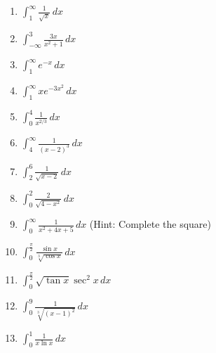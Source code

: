 \documentclass[12pt]{article}
\newif\ifans
\begin{document}
\begin{enumerate}

\item $\int_{1}^{\infty}\frac{1}{\sqrt{x}}\,dx$ 

\ifans{\fbox{$\infty$}} \fi

\item $\int_{-\infty}^{3}\frac{3x}{x^2+1}\,dx$ 

\ifans{\fbox{$-\infty$}} \fi

\item $\int_{1}^{\infty}e^{-x}\,dx$ 

\ifans{\fbox{$\frac{1}{e}$}} \fi

\item $\int_{1}^{\infty}xe^{-3x^2}\,dx$ 

\ifans{\fbox{$\frac{1}{6}e^{-3}$}} \fi

\item $\int_{0}^{4}\frac{1}{x^{2/3}}\,dx$ 

\ifans{\fbox{$3\sqrt[3]{4}$}} \fi

\item $\int_{4}^{\infty}\frac{1}{(x-2)^3}\,dx$ 

\ifans{\fbox{$\frac{1}{8}$}} \fi

\item $\int_2^6 \frac{1}{\sqrt{x-2}} \,dx$

\ifans{\fbox{$4$}} \fi

\item $\int_0^2 \frac{2}{\sqrt{4-x^2}} \,dx$

\ifans{\fbox{$\pi$}} \fi

\item $\int_0^{\infty} \frac{1}{x^2+4x+5} \,dx$ (Hint: Complete the square)

\ifans{\fbox{$\frac{\pi}{2}-\tan^{-1}(2)$}} \fi

\item $\int_0^{\frac{\pi}{2}} \frac{\sin{x}}{\sqrt[3]{\cos{x}}} \,dx$

\ifans{\fbox{$\frac{3}{2}$}} \fi

\item $\int_{0}^{\frac{\pi}{2}} \sqrt{\tan{x}}\sec^2{x} \,dx$

\ifans{\fbox{$\infty$}} \fi

\item $\int_0^9 \frac{1}{\sqrt[3]{(x-1)^2}} \,dx$

\ifans{\fbox{9}} \fi

\item $\int_{0}^{1}\frac{1}{x\ln{x}}\,dx$ 


\end{enumerate}
\end{document}
